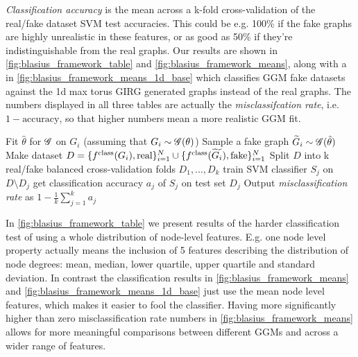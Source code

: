 \textit{Classification accuracy} is the mean across a k-fold cross-validation of the real/fake dataset SVM test accuracies. This could be e.g. 100\% if the fake graphs are highly unrealistic in these features, or as good as 50\% if they're indistinguishable from the real graphs. Our results are shown in \cref{fig:blasius_framework_table} and \cref{fig:blasius_framework_means}, along with a  in \cref{fig:blasius_framework_means_1d_base} which classifies GGM fake datasets against the 1d max torus GIRG generated graphs instead of the real graphs. The numbers displayed in all three tables are actually the \textit{misclassifcation rate}, i.e. $1 - \text{accuracy}$, so that higher numbers mean a more realistic GGM fit.

\begin{algorithm}
    \caption{High level overview of Bl{\"a}sius' Realism Framework}
    \label{alg:Blasius_realism_framework}
    \begin{algorithmic}
                \State Fit $\hat{\theta}$ for $\mathscr{G}$ on $G_i$ (assuming that $G_i \sim \mathscr{G}(\theta)$)
                \State Sample a fake graph  $\widetilde{G}_i \sim \mathscr{G}(\hat{\theta})$
            \EndFor
                \State Make dataset $D = \{f^{\mathrm{class}}(G_i), \text{real}\}_{i=1}^N \cup \{f^{\mathrm{class}}(\widetilde{G_i}), \text{fake}\}_{i=1}^N$
                \State Split $D$ into k real/fake balanced cross-validation folds $D_1, ..., D_k$
                    \State train SVM classifier $S_j$ on $D \setminus D_j$
                    \State get classification accuracy $a_j$ of $S_j$ on test set $D_j$
                \EndFor
                \State Output \textit{misclassification rate} as $1 - \frac{1}{k} \sum_{j=1}^k a_j$
            \EndFor

        \EndFor
    \end{algorithmic}
\end{algorithm}




In \cref{fig:blasius_framework_table} we present results of the harder classification test of using a whole distribution of node-level features. E.g. one node level property   actually means the inclusion of 5 features describing the distribution of node degrees: mean, median, lower quartile, upper quartile and standard deviation. In contrast the classification results in \cref{fig:blasius_framework_means} and \cref{fig:blasius_framework_means_1d_base} just use the mean node level features, which makes it easier to fool the classifier. Having more significantly higher than zero misclassification rate numbers in \cref{fig:blasius_framework_means} allows for more  meaningful comparisons between different GGMs and across a wider range of features.

